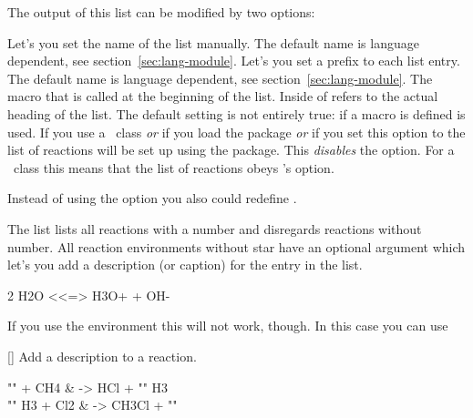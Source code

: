 \documentclass{chemmacros-manual}
\makeatletter
\renewenvironment{commands}
  {%
    \let\command\cnltx@command
    \let\explcommand\cnltx@explcommand
    \cnltxlist
  }
  {\endcnltxlist}
\makeatother
\begin{document}
The output of this list can be modified by two options:
\begin{options}
    Let's you set the name of the list manually.  The default name is language
    dependent, see section~\vref{sec:lang-module}.
    Let's you set a prefix to each list entry.  The default name is language
    dependent, see section~\vref{sec:lang-module}.
    The macro that is called at the beginning of the list.
    Inside of   refers to the actual heading of the list.
    The default setting is not entirely true: if a macro  is
    defined  is used.
    If you use a \KOMAScript\ class \emph{or} if you load
    the  package \emph{or} if you set this option to 
    the list of reactions will be set up using the  package.
    This \emph{disables} the  option.  For a
    \KOMAScript\ class this means that the list of reactions obeys
    \KOMAScript's  option.
\end{options}
Instead of using the option  you also could redefine
.

The list lists all reactions with a number and disregards reactions without
number.  All reaction environments without star have an optional argument
which let's you add a description (or caption) for the entry in the list.
\begin{example}
  \begin{reaction}[Autoprotolyse]
    2 H2O <<=> H3O+ + OH-
  \end{reaction}
\end{example}

If you use the  environment this will not work, though.  In
this case you can use
\begin{commands}
  \command{AddRxnDesc}[]
    Add a description to a reaction.
\end{commands}

\begin{example}
  \begin{reactions}
    "" + CH4  &
      -> HCl + "" H3  \\
    "" H3 + Cl2 &
      -> CH3Cl + "" 
  \end{reactions}
\end{example}
\end{document}
